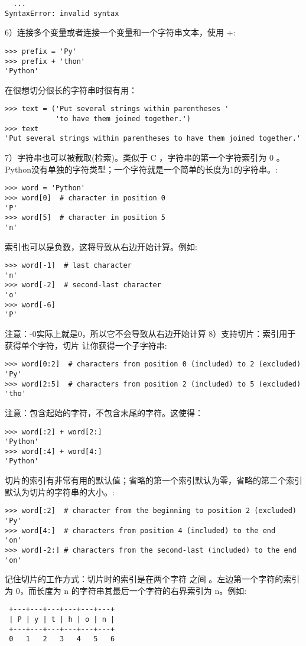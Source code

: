 \documentclass{article}
\begin{document}
\begin{CJK}{UTF8}{gbsn}
\begin{verbatim}
  ...
SyntaxError: invalid syntax
\end{verbatim}
6）连接多个变量或者连接一个变量和一个字符串文本，使用 +:
\begin{verbatim}
>>> prefix = 'Py'
>>> prefix + 'thon'
'Python'
\end{verbatim}
在很想切分很长的字符串时很有用：
\begin{verbatim}
>>> text = ('Put several strings within parentheses '
            'to have them joined together.')
>>> text
'Put several strings within parentheses to have them joined together.'
\end{verbatim}
7）字符串也可以被截取(检索)。类似于 C ，字符串的第一个字符索引为 0 。Python没有单独的字符类型；一个字符就是一个简单的长度为1的字符串。:
\begin{verbatim}
>>> word = 'Python'
>>> word[0]  # character in position 0
'P'
>>> word[5]  # character in position 5
'n'
\end{verbatim}
索引也可以是负数，这将导致从右边开始计算。例如:
\begin{verbatim}
>>> word[-1]  # last character
'n'
>>> word[-2]  # second-last character
'o'
>>> word[-6]
'P'
\end{verbatim}
注意：-0实际上就是0，所以它不会导致从右边开始计算
8）支持切片：索引用于获得单个字符，切片 让你获得一个子字符串:
\begin{verbatim}
>>> word[0:2]  # characters from position 0 (included) to 2 (excluded)
'Py'
>>> word[2:5]  # characters from position 2 (included) to 5 (excluded)
'tho'
\end{verbatim}
注意：包含起始的字符，不包含末尾的字符。这使得：
\begin{verbatim}
>>> word[:2] + word[2:]
'Python'
>>> word[:4] + word[4:]
'Python'
\end{verbatim}
切片的索引有非常有用的默认值；省略的第一个索引默认为零，省略的第二个索引默认为切片的字符串的大小。:
\begin{verbatim}
>>> word[:2]  # character from the beginning to position 2 (excluded)
'Py'
>>> word[4:]  # characters from position 4 (included) to the end
'on'
>>> word[-2:] # characters from the second-last (included) to the end
'on'
\end{verbatim}
记住切片的工作方式：切片时的索引是在两个字符 之间 。左边第一个字符的索引为 0，而长度为 n 的字符串其最后一个字符的右界索引为 n。例如:
\begin{verbatim}
 +---+---+---+---+---+---+
 | P | y | t | h | o | n |
 +---+---+---+---+---+---+
 0   1   2   3   4   5   6

\end{verbatim}
\end{CJK}
\end{document}
